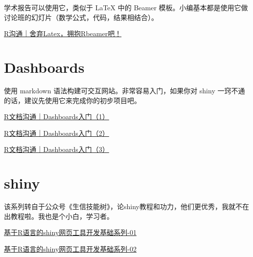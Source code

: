 \documentclass[
]{book}
\begin{document}
学术报告可以使用它，类似于 LaTeX 中的 Beamer 模板。小编基本都是使用它做讨论班的幻灯片（数学公式，代码，结果相结合）。

\href{http://mp.weixin.qq.com/s?__biz=MzI1NjUwMjQxMQ==\&mid=2247488659\&idx=1\&sn=738cd20bfccf8936b5d969483d4f6891\&chksm=ea24eb77dd536261e9cc68eac635d66113ea2e296d3b5ed6280410771c0b956be1af64f52eee\&scene=21\#wechat_redirect}{R沟通｜舍弃Latex，拥抱Rbeamer吧！}

\hypertarget{dashboards}{%
\section{Dashboards}\label{dashboards}}

使用 markdown 语法构建可交互网站。非常容易入门，如果你对 shiny 一窍不通的话，建议先使用它来完成你的初步项目吧。

\href{http://mp.weixin.qq.com/s?__biz=MzI1NjUwMjQxMQ==\&mid=2247494178\&idx=1\&sn=0580de258138d112e9362613ba0eb3c6\&chksm=ea2715c6dd509cd030957d168648c428b5511b39dc850b49234790b0233ceba5ddcceb176eff\&scene=21\#wechat_redirect}{R文档沟通｜Dashboards入门（1）}

\href{http://mp.weixin.qq.com/s?__biz=MzI1NjUwMjQxMQ==\&mid=2247494354\&idx=1\&sn=f2d9916c05c42e65b6cc75620deea8f3\&chksm=ea271536dd509c20f2ef427b4dd547196a7d1338e678dda7b1484bdc832977bbfef98d04f81b\&scene=21\#wechat_redirect}{R文档沟通｜Dashboards入门（2）}

\href{http://mp.weixin.qq.com/s?__biz=MzI1NjUwMjQxMQ==\&mid=2247494929\&idx=1\&sn=ac860a3a73a979e52a783e971d1bdda5\&chksm=ea2712f5dd509be30bad6c1ff96ddd9c826d9d7d27ef3dfc13943d6794d9450f860f76fc7f4a\&scene=21\#wechat_redirect}{R文档沟通｜Dashboards入门（3）}

\hypertarget{shiny}{%
\section{shiny}\label{shiny}}

该系列转自于公众号《生信技能树》，论shiny教程和功力，他们更优秀，我就不在出教程啦。我也是个小白，学习者。

\href{http://mp.weixin.qq.com/s?__biz=MzI1NjUwMjQxMQ==\&mid=2247490208\&idx=1\&sn=950d5ca8a3839346441096a0dcced3ae\&chksm=ea24e544dd536c52590d0fa77c366adbb841eb93364d44276fb6ad8420e607a3e946360aaf65\&scene=21\#wechat_redirect}{基于R语言的shiny网页工具开发基础系列-01}

\href{http://mp.weixin.qq.com/s?__biz=MzI1NjUwMjQxMQ==\&mid=2247490208\&idx=2\&sn=cdb9fee34dc815e08a9f28ff6dade73b\&chksm=ea24e544dd536c52972cc1253ab620f2d44c5078abd4d3dec7a47ce206df8436ab00449229d3\&scene=21\#wechat_redirect}{基于R语言的shiny网页工具开发基础系列-02}
\end{document}
